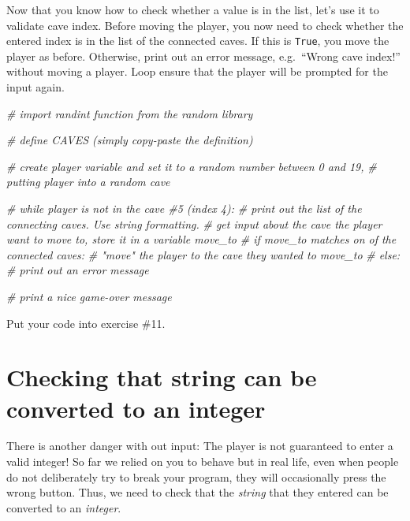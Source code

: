 \documentclass[
]{book}
\newenvironment{Shaded}{\begin{snugshade}}{\end{snugshade}}
\newcommand{\CommentTok}[1]{\textcolor[rgb]{0.56,0.35,0.01}{\textit{#1}}}
\begin{document}
Now that you know how to check whether a value is in the list, let's use it to validate cave index. Before moving the player, you now need to check whether the entered index is in the list of the connected caves. If this is \texttt{True}, you move the player as before. Otherwise, print out an error message, e.g.~``Wrong cave index!'' without moving a player. Loop ensure that the player will be prompted for the input again.

\begin{Shaded}
\begin{Highlighting}[]
\CommentTok{\# import randint function from the random library}

\CommentTok{\# define CAVES (simply copy{-}paste the definition)}

\CommentTok{\# create \textasciigrave{}player\textasciigrave{} variable and set it to a random number between 0 and 19, }
\CommentTok{\# putting player into a random cave}

\CommentTok{\# while player is not in the cave \#5 (index 4):}
    \CommentTok{\# print out the list of the connecting caves. Use string formatting.}
    \CommentTok{\# get input about the cave the player want to move to, store it in a variable \textasciigrave{}move\_to\textasciigrave{}}
    \CommentTok{\# if \textasciigrave{}move\_to\textasciigrave{} matches on of the connected caves:}
      \CommentTok{\# "move" the \textasciigrave{}player\textasciigrave{} to the cave they wanted to \textasciigrave{}move\_to\textasciigrave{}}
    \CommentTok{\# else:}
      \CommentTok{\# print out an error message}
    
\CommentTok{\# print a nice game{-}over message}
\end{Highlighting}
\end{Shaded}

Put your code into exercise \#11.

\hypertarget{checking-that-string-can-be-converted-to-an-integer}{%
\section{Checking that string can be converted to an integer}\label{checking-that-string-can-be-converted-to-an-integer}}

There is another danger with out input: The player is not guaranteed to enter a valid integer! So far we relied on you to behave but in real life, even when people do not deliberately try to break your program, they will occasionally press the wrong button. Thus, we need to check that the \emph{string} that they entered can be converted to an \emph{integer}.
\end{document}
